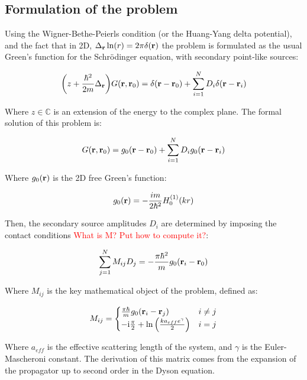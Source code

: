 \subsection{Formulation of the problem}

Using the Wigner-Bethe-Peierls condition (or the Huang-Yang delta potential), and the fact that in 2D, $\Delta_{\vb{r}}\ln(r)=2\pi \delta(\vb{r})$ the problem is formulated as the usual Green's function for the Schrödinger equation, with secondary point-like sources:

\begin{equation}
    \qty(z+\frac{\hbar^2}{2m}\Delta_{\vb{r}})G(\vb{r},\vb{r}_0)=\delta(\vb{r}-\vb{r}_0)+\sum_{i=1}^N D_i\delta({\vb{r}-\vb{r}_i})
\end{equation}

Where $z\in\mathbb C$ is an extension of the energy to the complex plane. The formal solution of this problem is:

\begin{equation}
    G(\vb{r},\vb{r}_0)=g_0(\vb{r}-\vb{r}_0)+\sum_{i=1}^N D_i g_0(\vb{r}-\vb{r}_i)
    \label{eq:formal_solution}
\end{equation}

Where $g_0(\vb{r})$ is the 2D free Green's function:

\begin{equation}
    \label{eq:2d_free_gf}
    g_0(\vb{r})=-\frac{im}{2\hbar^2}H_0^{(1)}(kr)
\end{equation}

Then, the secondary source amplitudes $D_i$ are determined by imposing the contact conditions \textcolor{red}{What is M? Put how to compute it?}:

\begin{equation}
    \sum_{j=1}^N M_{ij}D_j=-\frac{\pi\hbar ^2}{m}g_0(\vb{r}_i-\vb{r}_0)
\end{equation}

Where $M_{ij}$ is the key mathematical object of the problem, defined as:

\begin{equation}
    M_{ij}=\begin{cases}
        \frac{\pi\hbar}{m}g_0(\vb{r}_i-\vb{r}_j)&i\neq j\\
        -\text{i}\frac{\pi}{2}+\ln\qty(\frac{ka_{eff}e^{\gamma}}{2})&i=j
    \end{cases}
\end{equation}

Where $a_{eff}$ is the effective scattering length of the system, and $\gamma$ is the Euler-Mascheroni constant. The derivation of this matrix comes from the expansion of the propagator up to second order in the Dyson equation. 

